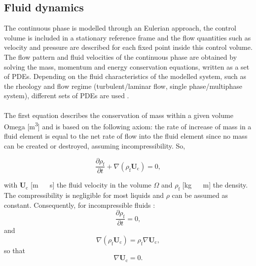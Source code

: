 \subsection[Fluid dynamics]{Fluid dynamics}\label{sec:FD}
The continuous phase is modelled through an Eulerian approach, the control volume is included in a stationary reference frame and the flow quantities such as velocity and pressure are described for each fixed point inside this control volume. The flow pattern and fluid velocities of the continuous phase are obtained by solving the mass, momentum and energy conservation equations, written as a set of \glspl{PDE}. %
Depending on the fluid characteristics of the modelled system, such as the rheology and flow regime (turbulent/laminar flow, single phase/multiphase system), different sets of \glspl{PDE} are used \citep{Versteeg1995,boekMS}.\\ \\
The first equation describes the conservation of mass within a given volume \gls{Omega} [\unit{\cubic\metre}] and is based on the following axiom: the rate of increase of mass in a fluid element is equal to the net rate of flow into the fluid element since no mass can be created or destroyed, assuming incompressibility. So, %

\begin{equation}
\frac{\partial \rho_\mathrm{f}}{\partial t} + \nabla ( \rho_\mathrm{f} \mathbf{U}_\mathrm{c}) = 0, \label{masscon}
\end{equation}

with $\mathbf{U}_\mathrm{c}$ [\unit{\metre\,\reciprocal\second}] the fluid velocity in the volume $\Omega$ and $\rho_\mathrm{f}$  [\unit{\kilogram\,\rpcubic\metre}] the density. The compressibility is negligible for most liquids and $\rho$ can be assumed as constant.  Consequently, for incompressible fluids \citep{Versteeg1995}:
\begin{equation}
\frac{\partial \rho_\mathrm{f}}{\partial t} = 0,
\end{equation}
and
\begin{equation}
 \nabla ( \rho_\mathrm{f} \mathbf{U}_\mathrm{c} ) = \rho_\mathrm{f} \nabla \mathbf{U}_\mathrm{c},
\end{equation}
so that
\begin{equation}
 \nabla \mathbf{U}_\mathrm{c} = 0.
\label{simpmasscon}
\end{equation}


